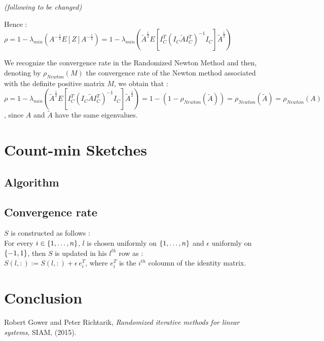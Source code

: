  
  
  \emph{(following to be changed)}

Hence :\\

$\rho = 1 - \lambda_{min}(A^{-\frac12}E[Z]A^{-\frac12}) = 1 - \lambda_{min}(\tilde{A}^{\frac 12} E[ I_{C}^{T} (I_{C} \tilde{A} I_{C}^{T})^{-1} I_{C} ] \tilde{A}^{\frac 12} ) $


We recognize the convergence rate in the Randomized Newton Method and then, denoting by $\rho_{Newton}(M)$ the convergence rate of the Newton method associated with the definite positive matrix $M$, we obtain that :\\
$\rho = 1 - \lambda_{min}( \tilde{A}^{\frac 12} E[ I_{C}^{T} (I_{C} \tilde{A} I_{C}^{T})^{-1} I_{C} ] \tilde{A}^{\frac 12}) = 1 -  (1 - \rho_{Newton}(\tilde{A} ) ) =  \rho_{Newton}(\tilde{A} ) = \rho_{Newton}(A) $, since $A$ and $\tilde{A}$ have the same eigenvalues.\\




\chapter{Count-min Sketches}

%
%
%

\section{Algorithm}


\section{Convergence rate}

$S$ is constructed as follows :\\
For every $i\in\left\{1,\dots,n\right\}$, $l$ is chosen uniformly on $\left\{1,\dots,n\right\}$ and $\epsilon$ uniformly on $\left\{-1,1\right\}$, then $S$ is updated in his $l^{th}$ row as :\\
$S(l, :) := S(l,:) + \epsilon \, e_{i}^{T}$, where $e_{i}^{T}$ is the $i^{th}$ coloumn of the identity matrix.

\chapter{Conclusion}

\appendix
\begin{thebibliography}{1}

\bibitem{}
{\sc Robert Gower and Peter Richtarik}, {\em Randomized iterative methods for linear systems}, SIAM, 
  (2015).



\end{thebibliography}





